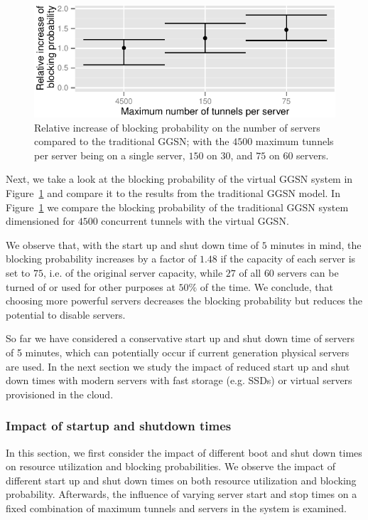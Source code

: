 \begin{figure}[htbp]
  \centering
  \includegraphics{images/blocking-comparison.pdf}
  \caption{Relative increase of blocking probability on the number of servers compared to the traditional \gls{GGSN}; with the $4500$ maximum tunnels per server being on a single server, $150$ on $30$, and $75$ on $60$ servers.}
 \label{c4:fig:blocking-comparison}
\end{figure}

Next, we take a look at the blocking probability of the virtual \gls{GGSN} system in Figure~\ref{c4:fig:blocking-comparison} and compare it to the results from the traditional \gls{GGSN} model. In Figure~\ref{c4:fig:blocking-comparison} we compare the blocking probability of the traditional \gls{GGSN} system dimensioned for $4500$ concurrent tunnels with the virtual \gls{GGSN}.

We observe that, with the start up and shut down time of $5$ minutes in mind, the blocking probability increases by a factor of $1.48$ if the capacity of each server is set to $75$, i.e.  of the original server capacity, while $27$ of all $60$ servers can be turned of or used for other purposes at $50\%$ of the time. We conclude, that choosing more powerful servers decreases the blocking probability but reduces the potential to disable servers.

So far we have considered a conservative start up and shut down time of servers of 5 minutes, which can potentially occur if current generation physical servers are used.
In the next section we study the impact of reduced start up and shut down times with modern servers with fast storage (e.g. \glspl{SSD}) or virtual servers provisioned in the cloud.


\subsubsection{Impact of startup and shutdown times}
\label{c4:sec:real_virtual_ggsn}

In this section, we first consider the impact of different boot and shut down times on resource utilization and blocking probabilities. We observe the impact of different start up and shut down times on both resource utilization and blocking probability. Afterwards, the influence of varying server start and stop times on a fixed combination of maximum tunnels and servers in the system is examined.

